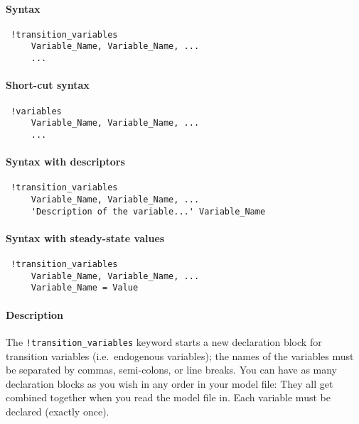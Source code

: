 


	\paragraph{Syntax}
 
 \begin{verbatim}
 !transition_variables
     Variable_Name, Variable_Name, ...
     ...
 \end{verbatim}
 
 \paragraph{Short-cut syntax}
 
 \begin{verbatim}
 !variables
     Variable_Name, Variable_Name, ...
     ...
 \end{verbatim}
 
 \paragraph{Syntax with descriptors}
 
 \begin{verbatim}
 !transition_variables
     Variable_Name, Variable_Name, ...
     'Description of the variable...' Variable_Name
 \end{verbatim}
 
 \paragraph{Syntax with steady-state values}
 
 \begin{verbatim}
 !transition_variables
     Variable_Name, Variable_Name, ...
     Variable_Name = Value
 \end{verbatim}
 
 \paragraph{Description}
 
 The \texttt{!transition\_variables} keyword starts a new declaration
 block for transition variables (i.e.~endogenous variables); the names of
 the variables must be separated by commas, semi-colons, or line breaks.
 You can have as many declaration blocks as you wish in any order in your
 model file: They all get combined together when you read the model file
 in. Each variable must be declared (exactly once).
 
